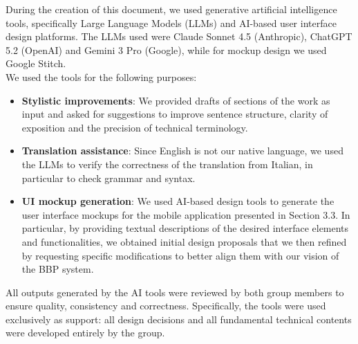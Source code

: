 \noindent
During the creation of this document, we used generative artificial intelligence tools, specifically Large Language Models (LLMs) and AI-based user interface design platforms. The LLMs used were Claude Sonnet 4.5 (Anthropic), ChatGPT 5.2 (OpenAI) and Gemini 3 Pro (Google), while for mockup design we used Google Stitch. \\
We used the tools for the following purposes: 
\begin{itemize}
    \item[] \textbf{Stylistic improvements}: We provided drafts of sections of the work as input and asked for suggestions to improve sentence structure, clarity of exposition and the precision of technical terminology.
    
    \item[] \textbf{Translation assistance}: Since English is not our native language, we used the LLMs to verify the correctness of the translation from Italian, in particular to check grammar and syntax.
    
    \item[] \textbf{UI mockup generation}: We used AI-based design tools to generate the user interface mockups for the mobile application presented in Section 3.3. In particular, by providing textual descriptions of the desired interface elements and functionalities, we obtained initial design proposals that we then refined by requesting specific modifications to better align them with our vision of the BBP system.
\end{itemize}
All outputs generated by the AI tools were reviewed by both group members to ensure quality, consistency and correctness. Specifically, the tools were used exclusively as support: all design decisions and all fundamental technical contents were developed entirely by the group.